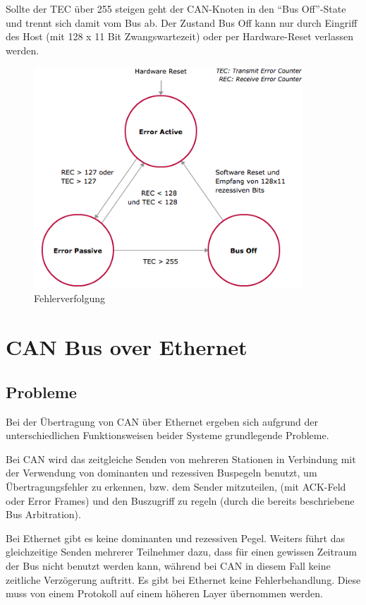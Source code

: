 Sollte der TEC über 255 steigen geht der CAN-Knoten in den ``Bus Off''-State und trennt sich damit
vom Bus ab. Der Zustand Bus Off kann nur durch Eingriff des Host (mit 128 x 11 Bit Zwangswartezeit) 
oder per Hardware-Reset verlassen werden.

\begin{figure}[h] 
\centering
\includegraphics[width=0.9\textwidth]{figures/errcount}
\caption{Fehlerverfolgung \citep{VEC}} 
\label{pic:errcount}
\end{figure} 

\clearpage
\section{CAN Bus over Ethernet}
	
\subsection{Probleme}

Bei der Übertragung von CAN über Ethernet ergeben sich aufgrund der unterschiedlichen
Funktionsweisen beider Systeme grundlegende Probleme.

Bei CAN wird das zeitgleiche Senden von mehreren Stationen in Verbindung mit der
Verwendung von dominanten und rezessiven Buspegeln benutzt, um Übertragungsfehler zu
erkennen, bzw. dem Sender mitzuteilen, (mit ACK-Feld oder Error Frames) und den
Buszugriff zu regeln (durch die bereits beschriebene Bus Arbitration).

Bei Ethernet gibt es keine dominanten und rezessiven Pegel. Weiters führt das
gleichzeitige Senden mehrerer Teilnehmer dazu, dass für einen gewissen Zeitraum der
Bus nicht benutzt werden kann, während bei CAN in diesem Fall keine zeitliche
Verzögerung auftritt. Es gibt bei Ethernet keine Fehlerbehandlung. Diese muss von
einem Protokoll auf einem höheren Layer übernommen werden.

